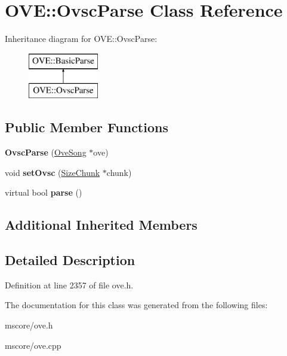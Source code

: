 \hypertarget{class_o_v_e_1_1_ovsc_parse}{}\section{O\+VE\+:\+:Ovsc\+Parse Class Reference}
\label{class_o_v_e_1_1_ovsc_parse}
Inheritance diagram for O\+VE\+:\+:Ovsc\+Parse\+:\begin{figure}[H]
\begin{center}
\leavevmode
\includegraphics[height=2.000000cm]{class_o_v_e_1_1_ovsc_parse}
\end{center}
\end{figure}
\subsection*{Public Member Functions}
\begin{DoxyCompactItemize}
\item 
\mbox{\label{class_o_v_e_1_1_ovsc_parse_a4a01647e51e2c3ae8671c8e4a81edce2}} 
{\bfseries Ovsc\+Parse} (\hyperlink{class_o_v_e_1_1_ove_song}{Ove\+Song} $\ast$ove)
\item 
\mbox{\label{class_o_v_e_1_1_ovsc_parse_a7ea1345c0f5cd89d7c3f0c9a634b6819}} 
void {\bfseries set\+Ovsc} (\hyperlink{class_o_v_e_1_1_size_chunk}{Size\+Chunk} $\ast$chunk)
\item 
\mbox{\label{class_o_v_e_1_1_ovsc_parse_abd0bef22077498c56eaed0eeb360dbce}} 
virtual bool {\bfseries parse} ()
\end{DoxyCompactItemize}
\subsection*{Additional Inherited Members}


\subsection{Detailed Description}


Definition at line 2357 of file ove.\+h.



The documentation for this class was generated from the following files\+:\begin{DoxyCompactItemize}
\item 
mscore/ove.\+h\item 
mscore/ove.\+cpp\end{DoxyCompactItemize}
